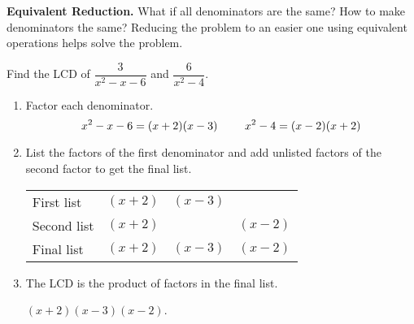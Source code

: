 \begin{trick}
	\textbf{Equivalent Reduction.} What if all denominators are the same? How to make denominators the same? Reducing the problem to an easier one using equivalent operations helps solve the problem.
\end{trick}


	\begin{example}
		Find the LCD of $\dfrac{3}{x^2-x-6}$ and $\dfrac{6}{x^2-4}$.
	\end{example}

	\begin{solution}\mbox{}
		\begin{enumerate}[label={\textbf{\textup{Step \arabic*.}}~}]
			\item Factor each denominator.
			      \[
				      \null\hfill x^2-x-6=(x+2)(x-3)\hspace{2\baselineskip} x^2-4=(x-2)(x+2)\hfill\null
			      \]
			\item \begin{multicols}{2} List the factors of the first denominator and add unlisted factors of the second factor to get the final list.

				      \columnbreak

				      \begin{tabular}{l|c|c|c}
					      First list  & $(x+2)$ & $(x-3)$ &         \\
					      Second list & $(x+2)$ &         & $(x-2)$ \\
					      \hline
					      Final list  & $(x+2)$ & $(x-3)$ & $(x-2)$
				      \end{tabular}
			      \end{multicols}
			      \vspace*{-0.75\baselineskip}
			\item The LCD is the product of factors in the final list.\\
			      \centerline{$(x+2)(x-3)(x-2)$.}
		\end{enumerate}
	\end{solution}

